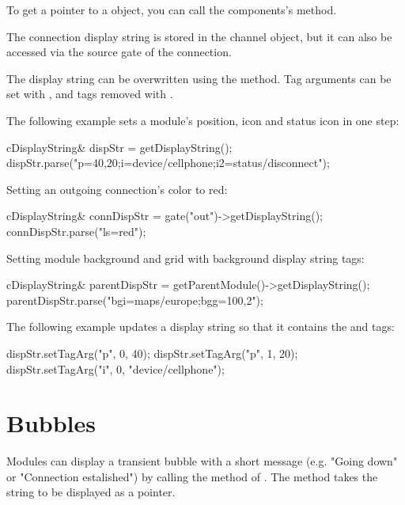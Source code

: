 To get a pointer to a  object, you can call
the components's  method.

\begin{note}
The connection display string is stored in the channel object, but it
can also be accessed via the source gate of the connection.
\end{note}

The display string can be overwritten using the  method.
Tag arguments can be set with , and tags removed
with .

The following example sets a module's position, icon and status icon
in one step:

\begin{cpp}
cDisplayString& dispStr = getDisplayString();
dispStr.parse("p=40,20;i=device/cellphone;i2=status/disconnect");
\end{cpp}

Setting an outgoing connection's color to red:

\begin{cpp}
cDisplayString& connDispStr = gate("out")->getDisplayString();
connDispStr.parse("ls=red");
\end{cpp}

Setting module background and grid with background display string tags:

\begin{cpp}
cDisplayString& parentDispStr = getParentModule()->getDisplayString();
parentDispStr.parse("bgi=maps/europe;bgg=100,2");
\end{cpp}

The following example updates a display string so that it contains
the  and  tags:

\begin{cpp}
dispStr.setTagArg("p", 0, 40);
dispStr.setTagArg("p", 1, 20);
dispStr.setTagArg("i", 0, "device/cellphone");
\end{cpp}

\section{Bubbles}

Modules can display a transient bubble with a short message (e.g. "Going
down" or "Connection estalished") by calling the  method of
. The method takes the string to be displayed as a
 pointer.

